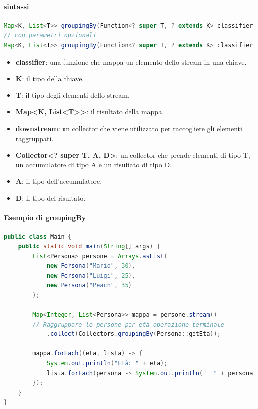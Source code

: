\documentclass[11pt]{article}
\begin{document}
\paragraph{sintassi}
\begin{lstlisting}[language=Java]
Map<K, List<T>> groupingBy(Function<? super T, ? extends K> classifier)
// con parametri opzionali
Map<K, List<T>> groupingBy(Function<? super T, ? extends K> classifier, Collector<? super T, A, D> downstream)
\end{lstlisting}
\begin{itemize}
    \item \textbf{classifier}: una funzione che mappa un elemento dello stream in una chiave.
    \item \textbf{K}: il tipo della chiave.
    \item \textbf{T}: il tipo degli elementi dello stream.
    \item \textbf{Map<K, List<T>>}: il risultato della mappa.
    \item \textbf{downstream}: un collector che viene utilizzato per raccogliere gli elementi raggruppati.
    \item \textbf{Collector<? super T, A, D>}: un collector che prende elementi di tipo T, un accumulatore di tipo A e un risultato di tipo D.
    \item \textbf{A}: il tipo dell'accumulatore.
    \item \textbf{D}: il tipo del risultato.
    \end{itemize}
\paragraph{Esempio di groupingBy}
\begin{lstlisting}[language=Java]
public class Main {
    public static void main(String[] args) {
        List<Persona> persone = Arrays.asList(
            new Persona("Mario", 30),
            new Persona("Luigi", 25),
            new Persona("Peach", 35)
        );

        Map<Integer, List<Persona>> mappa = persone.stream()
        // Raggruppare le persone per età operazione terminale
            .collect(Collectors.groupingBy(Persona::getEta));

        mappa.forEach((eta, lista) -> {
            System.out.println("Età: " + eta);
            lista.forEach(persona -> System.out.println("  " + persona.getNome()));
        });
    }
}
\end{lstlisting}
\end{document}
